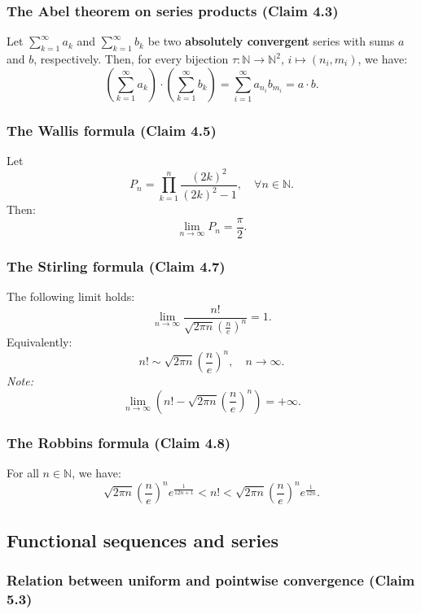 \subsubsection{The Abel theorem on series products (Claim 4.3)}



Let $\sum_{k=1}^\infty a_k$ and $\sum_{k=1}^\infty b_k$ be two \textbf{absolutely convergent} series with sums $a$ and $b$, respectively. Then, for every bijection $\tau : \mathbb{N} \to \mathbb{N}^2$, $i \mapsto (n_i, m_i)$, we have:
\[
    \left( \sum_{k=1}^\infty a_k \right) \cdot \left( \sum_{k=1}^\infty b_k \right) = \sum_{i=1}^\infty a_{n_i} b_{m_i} = a \cdot b.
\]

\subsubsection{The Wallis formula (Claim 4.5)}


Let
\[
    P_n = \prod_{k=1}^n \frac{(2k)^2}{(2k)^2 - 1}, \quad \forall n \in \mathbb{N}.
\]
Then:
\[
    \lim_{n \to \infty} P_n = \frac{\pi}{2}.
\]

\subsubsection{The Stirling formula (Claim 4.7)}


The following limit holds:
\[
    \lim_{n \to \infty} \frac{n!}{\sqrt{2 \pi n} \left( \frac{n}{e} \right)^n} = 1.
\]
Equivalently:
\[
    n! \sim \sqrt{2 \pi n} \left( \frac{n}{e} \right)^n, \quad n \to \infty.
\]
\textit{Note:}
\[
    \lim_{n \to \infty} \left( n! - \sqrt{2 \pi n} \left( \frac{n}{e} \right)^n \right) = +\infty.
\]

\subsubsection{The Robbins formula (Claim 4.8)}


For all $n \in \mathbb{N}$, we have:
\[
    \sqrt{2 \pi n} \left( \frac{n}{e} \right)^n e^{\frac{1}{12n+1}} < n! < \sqrt{2 \pi n} \left( \frac{n}{e} \right)^n e^{\frac{1}{12n}}.
\]


\clearpage

\subsection{Functional sequences and series}

\subsubsection{Relation between uniform and pointwise convergence (Claim 5.3)}


